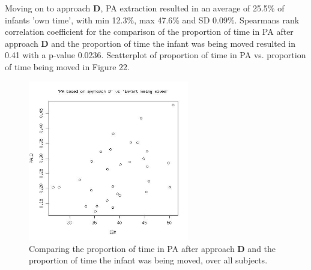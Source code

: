 \documentclass{article}
\begin{document}
{Moving on to approach \textbf{D}, PA extraction resulted in an average of 25.5\% of infants 'own time', with min 12.3\%, max 47.6\% and SD 0.09\%. Spearmans rank correlation coefficient for the comparison of the proportion of time in PA after approach \textbf{D} and the proportion of time the infant was being moved resulted in 0.41 with a p-value 0.0236. Scatterplot of proportion of time in PA vs. proportion of time being moved in Figure 22.\\
\begin{figure}[h]
\includegraphics[width=7cm, height=7cm]{scatterplotPADIBM.jpg}
\caption{Comparing the proportion of time in PA after approach \textbf{D} and the proportion of time the infant was being moved, over all subjects.}
\end{figure}

}
\end{document}
